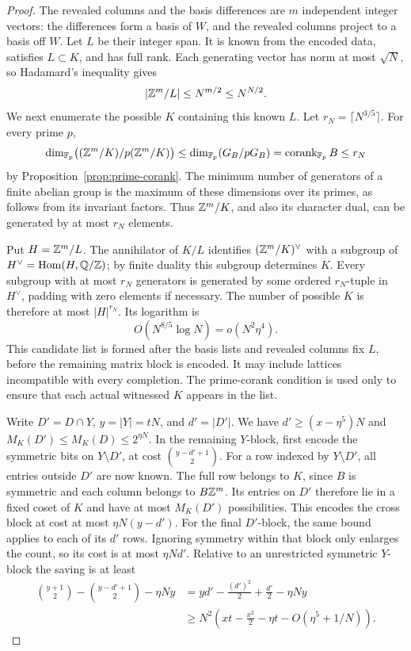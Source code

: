 \begin{proof}
The revealed columns and the basis differences are \(m\) independent
integer vectors: the differences form a basis of \(W\), and the
revealed columns project to a basis off \(W\). Let \(L\) be their
integer span. It is known from the encoded data, satisfies
\(L\subset K\), and has full rank. Each generating vector has norm
at most \(\sqrt N\), so Hadamard's inequality gives
\[
 |\mathbb Z^m/L|\le N^{m/2}\le N^{N/2}.
\]
We next enumerate the possible \(K\) containing this known \(L\).
Let \(r_N=\lceil N^{3/5}\rceil\). For every prime \(p\),
\[
 \dim_{\mathbb F_p}\bigl((\mathbb Z^m/K)/p(\mathbb Z^m/K)\bigr)
 \le\dim_{\mathbb F_p}(G_B/pG_B)
 =\operatorname{corank}_{\mathbb F_p}B\le r_N
\]
by Proposition~\ref{prop:prime-corank}. The minimum number of
generators of a finite abelian group is the maximum of these
dimensions over its primes, as follows from its invariant factors.
Thus \(\mathbb Z^m/K\), and also its character dual, can be generated by at most
\(r_N\) elements.

Put \(H=\mathbb Z^m/L\). The annihilator of \(K/L\) identifies
\((\mathbb Z^m/K)^\vee\) with a subgroup of
\(H^\vee=\operatorname{Hom}(H,\mathbb Q/\mathbb Z)\); by finite duality this subgroup determines
\(K\). Every subgroup with at most
\(r_N\) generators is generated by some ordered \(r_N\)-tuple in
\(H^\vee\), padding with zero elements if necessary. The number of
possible \(K\) is therefore at most \(|H|^{r_N}\). Its logarithm is
\begin{equation}\label{eq:witness-lattice-cost}
 O(N^{8/5}\log N)=o(N^2\eta^4).
\end{equation}
This candidate list is formed after the basis lists and revealed
columns fix \(L\), before the remaining matrix block is encoded.
It may include lattices incompatible with every completion. The
prime-corank condition is used only to ensure that each actual
witnessed \(K\) appears in the list.

Write \(D'=D\cap Y\), \(y=|Y|=tN\), and \(d'=|D'|\). We have
\(d'\ge(x-\eta^5)N\) and \(M_K(D')\le M_K(D)\le2^{\eta N}\). In the
remaining \(Y\)-block, first encode the symmetric bits on
\(Y\setminus D'\), at cost \(\binom{y-d'+1}{2}\). For a row indexed
by \(Y\setminus D'\), all entries outside \(D'\) are now known.
The full row belongs to \(K\), since \(B\) is symmetric and each
column belongs to \(B\mathbb Z^m\). Its entries on \(D'\) therefore lie in a
fixed coset of \(K\) and have at most \(M_K(D')\) possibilities.
This encodes the cross block at cost at most \(\eta N(y-d')\).
For the final \(D'\)-block, the same bound applies to each of its
\(d'\) rows. Ignoring symmetry within that block only enlarges the
count, so its cost is at most \(\eta Nd'\). Relative to an unrestricted
symmetric \(Y\)-block the saving is at least
\[
 \begin{split}
 \binom{y+1}{2}-\binom{y-d'+1}{2}-\eta Ny
 &=yd'-\frac{(d')^2}{2}+\frac{d'}2-\eta Ny\\
 &\ge N^2\left(xt-\frac{x^2}{2}-\eta t
                  -O(\eta^5+1/N)\right).
 \end{split}
\]


\end{proof}
